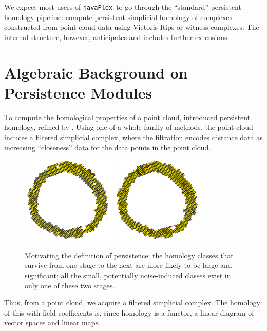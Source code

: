 \documentclass{gts2012}
\newcommand\javaPlex{\texttt{javaPlex}\ }
\begin{document}
We expect most users of \javaPlex to go through the ``standard'' persistent homology pipeline: compute persistent simplicial homology of complexes constructed from point cloud data using Vietoris-Rips or witness complexes. The internal structure, however, anticipates and includes further extensions.



\section{Algebraic Background on Persistence Modules}

To compute the homological properties of a point cloud,
\cite{ELZ_02} introduced persistent homology, refined by
\cite{Carlsson_04}. Using one of a whole family of methods, the point
cloud induces a filtered simplicial complex, where the filtration
encodes distance data as increasing ``closeness'' data for the data
points in the point cloud.

\begin{figure}[h]
  \centering
  \includegraphics[width=0.4\textwidth]{images/perripstwo}
  \includegraphics[width=0.4\textwidth]{images/perripsthree}
  \caption{Motivating the definition of persistence: the homology classes that survive from one stage to the next are more likely to be large and significant; all the small, potentially noise-induced classes exist in only one of these two stages.}
  \label{fig:betti3}
\end{figure}

Thus, from a point cloud, we acquire a filtered simplicial
complex. The homology of this with field coefficients is, since
homology is a functor, a linear diagram of vector spaces and linear
maps. 
\end{document}
